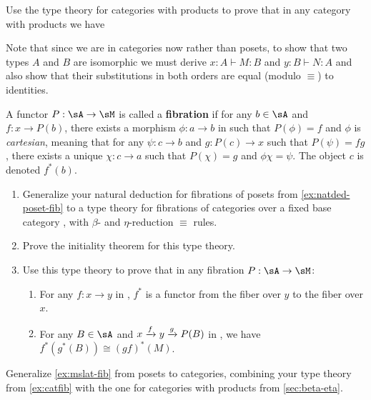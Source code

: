\documentclass{book}
\let\types\vdash
\def\unit{\mathbf{1}}
\begin{document}
\begin{ex}
  Use the type theory for categories with products to prove that in any category with products we have
  Note that since we are in categories now rather than posets, to show that two types $A$ and $B$ are isomorphic we must derive $x:A\types M:B$ and $y:B\types N:A$ and also show that their substitutions in both orders are equal (modulo $\equiv$) to identities.
\end{ex}

\begin{ex}\label{ex:catfib}
  A functor $P:\sA\to \sM$ is called a \textbf{fibration} if for any $b\in \sA$ and $f:x\to P(b)$, there exists a morphism $\phi:a\to b$ in \sA such that $P(\phi)=f$ and $\phi$ is \emph{cartesian}, meaning that for any $\psi:c\to b$ and $g:P(c)\to x$ such that $P(\psi)=fg$, there exists a unique $\chi:c\to a$ such that $P(\chi)=g$ and $\phi\chi=\psi$.
  The object $c$ is denoted $f^*(b)$.
  \begin{enumerate}
  \item Generalize your natural deduction for fibrations of posets from \cref{ex:natded-poset-fib} to a type theory for fibrations of categories over a fixed base category \sM, with $\beta$- and $\eta$-reduction $\equiv$ rules.
  \item Prove the initiality theorem for this type theory.
  \item Use this type theory to prove that in any fibration $P:\sA\to\sM$:
    \begin{enumerate}
    \item For any $f:x\to y$ in \sM, $f^*$ is a functor from the fiber over $y$ to the fiber over $x$.
    \item For any $B\in \sA$ and $x\xrightarrow{f} y \xrightarrow{g} P(B)$ in \sM, we have $f^*(g^*(B)) \cong (gf)^*(M)$.
    \end{enumerate}
  \end{enumerate}
\end{ex}

\begin{ex}\label{ex:catprod-fib}
  Generalize \cref{ex:mslat-fib} from posets to categories, combining your type theory from \cref{ex:catfib} with the one for categories with products from \cref{sec:beta-eta}.
\end{ex}
\end{document}
